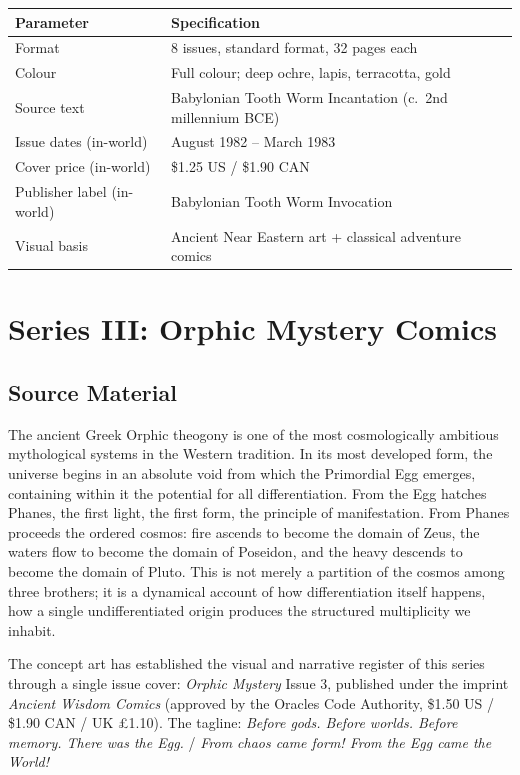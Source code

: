 \documentclass[12pt, a4paper]{article}
\begin{document}
\begin{center}
\begin{tabular}{lp{9cm}}
\toprule
\textbf{Parameter} & \textbf{Specification} \\
\midrule
Format & 8 issues, standard format, 32 pages each \\
Colour & Full colour; deep ochre, lapis, terracotta, gold \\
Source text & Babylonian Tooth Worm Incantation (c.\ 2nd millennium BCE) \\
Issue dates (in-world) & August 1982 -- March 1983 \\
Cover price (in-world) & \$1.25 US / \$1.90 CAN \\
Publisher label (in-world) & Babylonian Tooth Worm Invocation \\
Visual basis & Ancient Near Eastern art + classical adventure comics \\
\bottomrule
\end{tabular}
\end{center}

\newpage
\section{Series III: Orphic Mystery Comics}

\subsection{Source Material}

The ancient Greek Orphic theogony is one of the most cosmologically ambitious mythological systems in the Western tradition. In its most developed form, the universe begins in an absolute void from which the Primordial Egg emerges, containing within it the potential for all differentiation. From the Egg hatches Phanes, the first light, the first form, the principle of manifestation. From Phanes proceeds the ordered cosmos: fire ascends to become the domain of Zeus, the waters flow to become the domain of Poseidon, and the heavy descends to become the domain of Pluto. This is not merely a partition of the cosmos among three brothers; it is a dynamical account of how differentiation itself happens, how a single undifferentiated origin produces the structured multiplicity we inhabit.

The concept art has established the visual and narrative register of this series through a single issue cover: \textit{Orphic Mystery} Issue 3, published under the imprint \textit{Ancient Wisdom Comics} (approved by the Oracles Code Authority, \$1.50 US / \$1.90 CAN / UK \pounds1.10). The tagline: \textit{Before gods. Before worlds. Before memory. There was the Egg.} / \textit{From chaos came form! From the Egg came the World!}
\end{document}
